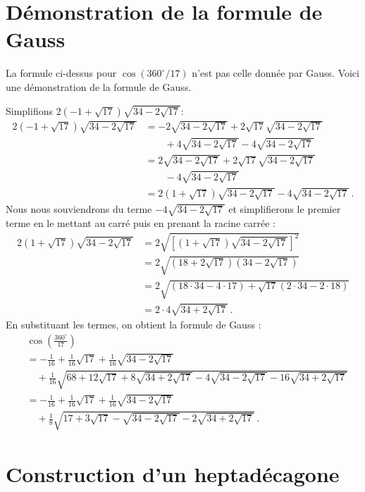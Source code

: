 \section{Démonstration de la formule de Gauss}\label{s.derivation}

La formule ci-dessus pour $\cos(360^\circ /17)$ n'est pas celle donnée par Gauss. Voici une démonstration de la formule de Gauss.

Simplifions $2(-1+\sqrt{17})\sqrt{34-2\sqrt{17}}$:
\begin{align*}
2(-1+\sqrt{17})\sqrt{34-2\sqrt{17}} &=
-2\sqrt{34-2\sqrt{17}} +2\sqrt{17}\sqrt{34-2\sqrt{17}}\\
&\quad \quad +4\sqrt{34-2\sqrt{17}}-4\sqrt{34-2\sqrt{17}}\\
&=
2\sqrt{34-2\sqrt{17}} +2\sqrt{17}\sqrt{34-2\sqrt{17}}\\
&\quad \quad -4\sqrt{34-2\sqrt{17}}\\
&=2(1+\sqrt{17})\sqrt{34-2\sqrt{17}}-4\sqrt{34-2\sqrt{17}}\,.
\end{align*}
Nous nous souviendrons du terme $-4\sqrt{34-2\sqrt{17}}$  et simplifierons le premier terme en le mettant au carré puis en prenant la racine carrée :
\begin{align*}
2(1+\sqrt{17})\sqrt{34-2\sqrt{17}}&=
2\sqrt{\left[(1+\sqrt{17})\sqrt{34-2\sqrt{17}}\right]^2}\\
&=2\sqrt{(18+2\sqrt{17})(34-2\sqrt{17})}\\
&=2\sqrt{(18\cdot 34-4\cdot17)+\sqrt{17}(2\cdot 34 - 2\cdot 18)}\\
&=2\cdot 4\sqrt{34+2\sqrt{17}}\,.
\end{align*}
En substituant les termes, on obtient la formule de Gauss :
\begin{align*}
&\cos\left(\frac{360^\circ}{17}\right) \\
&=
-\frac{1}{16}+\frac{1}{16}\sqrt{17} + 
     \frac{1}{16}\sqrt{34-2\sqrt{17}} \\
    &
     \quad +\frac{1}{16}\sqrt{
     68+12\sqrt{17} + 
     8\sqrt{34+2\sqrt{17}}-4\sqrt{34-2\sqrt{17}}
   -16
     \sqrt{34+2\sqrt{17}}
   }\\
&=-\frac{1}{16}+\frac{1}{16}\sqrt{17} + 
     \frac{1}{16}\sqrt{34-2\sqrt{17}}\\
&\quad +\frac{1}{8}\sqrt{
     17+3\sqrt{17} - 
     \sqrt{34-2\sqrt{17}}
   -2
     \sqrt{34+2\sqrt{17}}
   }\,.
\end{align*}

\section{Construction d'un heptadécagone}\label{s.construction}

